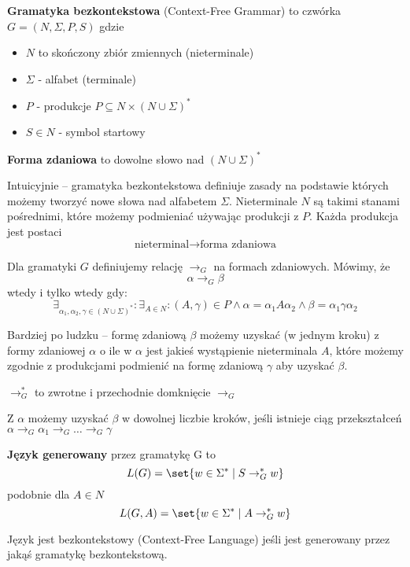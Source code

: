 \begin{definition}
\textbf{Gramatyka bezkontekstowa} (Context-Free Grammar) to czwórka \( G = (N, \Sigma, P, S) \) gdzie
\begin{itemize}
    \item \( N \) to skończony zbiór zmiennych (nieterminale)
    \item \( \Sigma \) - alfabet (terminale)
    \item \( P \) - produkcje \( P \subseteq N \times (N \cup \Sigma)^* \)
    \item \( S \in N \) - symbol startowy
\end{itemize}
\end{definition}

\begin{definition}
    \textbf{Forma zdaniowa} to dowolne słowo nad \( (N \cup \Sigma)^* \)
\end{definition}

Intuicyjnie -- gramatyka bezkontekstowa definiuje zasady na podstawie których możemy tworzyć nowe słowa nad alfabetem \( \Sigma \).
Nieterminale \( N \) są takimi stanami pośrednimi, które możemy podmieniać używając produkcji z \( P \).
Każda produkcja jest postaci
\[
    \text{nieterminal} \rightarrow \text{forma zdaniowa}
\]


\begin{definition}
    Dla gramatyki \( G \) definiujemy relację \( \rightarrow_G \) na formach zdaniowych.
    Mówimy, że 
    \[ 
        \alpha \rightarrow_G \beta 
    \]
    wtedy i tylko wtedy gdy:
    \[
        \exists_{\alpha_1, \alpha_2, \gamma \in (N \cup \Sigma)^*} : \exists_{A \in N} : (A, \gamma) \in P \land
        \alpha = \alpha_1  A \alpha_2 \land \beta = \alpha_1 \gamma \alpha_2
    \]
\end{definition}

Bardziej po ludzku -- formę zdaniową \( \beta \) możemy uzyskać (w jednym kroku) z formy zdaniowej \( \alpha \) o ile w  \( \alpha \) jest jakieś wystąpienie nieterminala \( A \), które możemy zgodnie z produkcjami podmienić na formę zdaniową \( \gamma \) aby uzyskać \( \beta \).

\begin{definition}
    \( \rightarrow_G^* \) to zwrotne i przechodnie domknięcie \( \rightarrow_G \)
\end{definition}

Z \( \alpha \) możemy uzyskać \( \beta \) w dowolnej liczbie kroków, jeśli istnieje ciąg przekształceń \( \alpha \rightarrow_G \alpha_1 \rightarrow_G \dots \rightarrow_G \gamma \)


\begin{definition}
    \textbf{Język  generowany} przez gramatykę G to 
    \[
        L(G) = \set{w \in \Sigma^* \mid S \rightarrow_G^* w}
    \]
    podobnie dla \( A \in N \)
    \[
        L(G, A) = \set{w \in \Sigma^* \mid A \rightarrow_G^* w}
    \]
\end{definition}

\begin{definition}
    Język jest bezkontekstowy (Context-Free Language) jeśli jest generowany przez jakąś gramatykę bezkontekstową.
\end{definition}